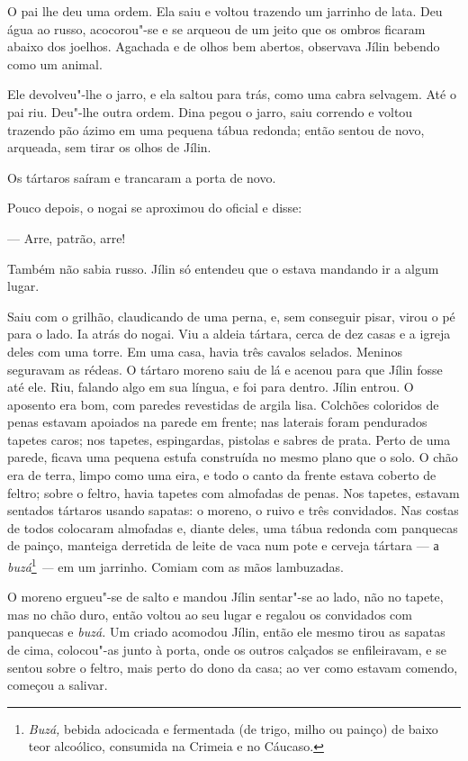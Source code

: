 O pai lhe deu uma ordem. Ela saiu e voltou trazendo um jarrinho de lata.
Deu água ao russo, acocorou"-se e se arqueou de um jeito que os ombros
ficaram abaixo dos joelhos. Agachada e de olhos bem abertos, observava
Jílin bebendo como um animal.

Ele devolveu"-lhe o jarro, e ela saltou para trás, como uma cabra
selvagem. Até o pai riu. Deu"-lhe outra ordem. Dina pegou o jarro, saiu
correndo e voltou trazendo pão ázimo em uma pequena tábua redonda; então
sentou de novo, arqueada, sem tirar os olhos de Jílin.

Os tártaros saíram e trancaram a porta de novo.

Pouco depois, o nogai se aproximou do oficial e disse:

--- Arre, patrão, arre!

Também não sabia russo. Jílin só entendeu que o estava mandando ir a
algum lugar.

Saiu com o grilhão, claudicando de uma perna, e, sem conseguir pisar,
virou o pé para o lado. Ia atrás do nogai. Viu a aldeia tártara, cerca
de dez casas e a igreja deles com uma torre. Em uma casa, havia três
cavalos selados. Meninos seguravam as rédeas. O tártaro moreno saiu de
lá e acenou para que Jílin fosse até ele. Riu, falando algo em sua
língua, e foi para dentro. Jílin entrou. O aposento era bom, com paredes
revestidas de argila lisa. Colchões coloridos de penas estavam apoiados
na parede em frente; nas laterais foram pendurados tapetes caros; nos
tapetes, espingardas, pistolas e sabres de prata. Perto de uma parede,
ficava uma pequena estufa construída no mesmo plano que o solo. O chão
era de terra, limpo como uma eira, e todo o canto da frente estava
coberto de feltro; sobre o feltro, havia tapetes com almofadas de penas.
Nos tapetes, estavam sentados tártaros usando sapatas: o moreno, o ruivo
e três convidados. Nas costas de todos colocaram almofadas e, diante
deles, uma tábua redonda com panquecas de painço, manteiga derretida de
leite de vaca num pote e cerveja tártara --- а \emph{buzá}\footnote{\emph{Buzá,}
  bebida adocicada e fermentada (de trigo, milho ou painço) de baixo
  teor alcoólico, consumida na Crimeia e no Cáucaso.} \emph{---} em um
jarrinho. Comiam com as mãos lambuzadas.

O moreno ergueu"-se de salto e mandou Jílin sentar"-se ao lado, não no
tapete, mas no chão duro, então voltou ao seu lugar e regalou os convidados
com panquecas e \emph{buzá.} Um criado acomodou Jílin, então ele mesmo
tirou as sapatas de cima, colocou"-as junto à porta, onde os outros
calçados se enfileiravam, e se sentou sobre o feltro, mais perto do dono
da casa; ao ver como estavam comendo, começou a salivar.


